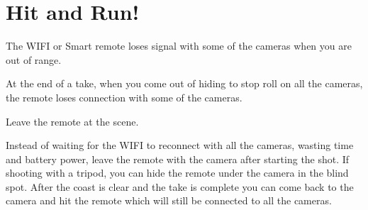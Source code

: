\chapter{Hit and Run!}
\pagecolor{white}
\label{chap:15}
\begin{fullwidth}


\problem

{\large The WIFI or Smart remote loses signal with some of the cameras when you are out of range. \par}

At the end of a take, when you come out of hiding to stop roll on all the cameras, the remote loses connection with some of the cameras.


\solution

{\large Leave the remote at the scene. \par}

Instead of waiting for the WIFI to reconnect with all the cameras, wasting time and battery power, leave the remote with the camera after starting the shot. If shooting with a tripod, you can hide the remote under the camera in the blind spot. After the coast is clear and the take is complete you can come back to the camera and hit the remote which will still be connected to all the cameras.




\clearpage
\end{fullwidth}
